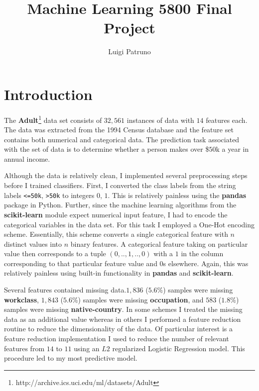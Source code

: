 \documentclass[11pt, oneside]{article}   	%
\title{Machine Learning 5800 Final Project}
\author{Luigi Patruno}
\begin{document}
\maketitle



\section{Introduction}

The \textbf{Adult}\footnote[1]{http://archive.ics.uci.edu/ml/datasets/Adult} data set consists of $32,561$ instances of data with $14$ features each. The data was extracted from the 1994 Census database and the feature set contains both numerical and categorical data. The prediction task associated with the set of data is to determine whether a person makes over \$$50$k a year in annual income. 

Although the data is relatively clean, I implemented several preprocessing steps before I trained classifiers. First, I converted the class labels from the string labels \texttt{<=50k}, \texttt{>50k} to integers $0$, $1$. This is relatively painless using the \textbf{pandas} package in Python. Further, since the machine learning algorithms from the \textbf{scikit-learn} module expect numerical input feature, I had to encode the categorical variables in the data set. For this task I employed a One-Hot encoding scheme. Essentially, this scheme converts a single categorical feature with $n$ distinct values into $n$ binary features. A categorical feature taking on particular value then corresponds to a tuple $(0,..,1,..,0)$ with a $1$ in the column corresponding to that particular feature value and $0$s elsewhere. Again, this was relatively painless using built-in functionality in \textbf{pandas} and \textbf{scikit-learn}.

Several features contained missing data.$1,836$ ($5.6$\%) samples were missing \textbf{workclass}, $1,843$ ($5.6$\%) samples were missing \textbf{occupation}, and $583$ ($1.8$\%) samples were missing \textbf{native-country}. In some schemes I treated the missing data as an additional value whereas in others I performed a feature reduction routine to reduce the dimensionality of the data. Of particular interest is a feature reduction implementation I used to reduce the number of relevant features from $14$ to $11$ using an $L2$ regularized Logistic Regression model. This procedure led to my most predictive model.
\end{document}
